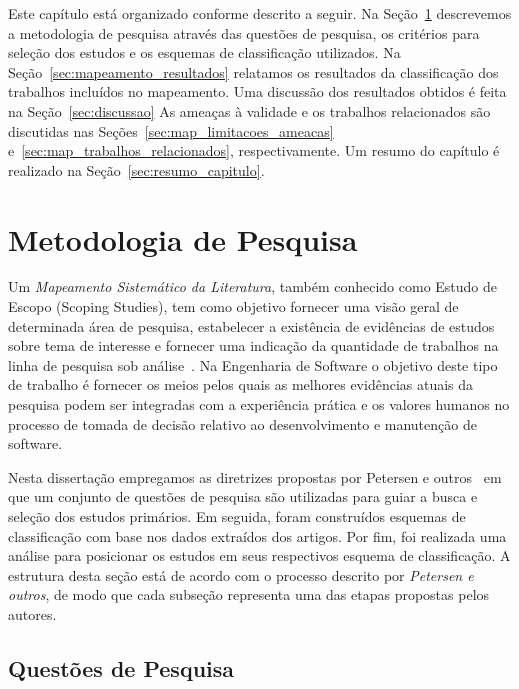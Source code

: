Este capítulo está organizado conforme descrito a seguir. Na
Seção~\ref{sec:map-metodologia} descrevemos a metodologia de pesquisa através
das questões de pesquisa, os critérios para seleção dos estudos  e os esquemas
de classificação utilizados. Na Seção~\ref{sec:mapeamento_resultados} relatamos
os resultados da classificação dos trabalhos incluídos no mapeamento. Uma
discussão dos resultados obtidos é feita na Seção~\ref{sec:discussao} As ameaças
à validade e os trabalhos relacionados são discutidas nas
Seções~\ref{sec:map_limitacoes_ameacas} e~\ref{sec:map_trabalhos_relacionados},
respectivamente. Um resumo do capítulo é realizado na
Seção~\ref{sec:resumo_capitulo}.

\section{Metodologia de Pesquisa}
\label{sec:map-metodologia}

Um \textit{Mapeamento Sistemático da Literatura}, também conhecido como Estudo
de Escopo (Scoping Studies), tem como objetivo fornecer uma visão geral de
determinada área de pesquisa, estabelecer a existência de evidências de estudos
sobre tema de interesse e fornecer uma indicação da quantidade de trabalhos na
linha de pesquisa sob
análise~\cite{keele2007guidelines,wohlin2012experimentation}. Na Engenharia de
Software o objetivo deste tipo de trabalho é fornecer os meios pelos quais as
melhores evidências atuais da pesquisa podem ser integradas com a experiência
prática e os valores humanos no processo de tomada de decisão relativo ao
desenvolvimento e manutenção de software.

Nesta dissertação empregamos as diretrizes propostas por Petersen e
outros~\cite{Petersen2008} em que um conjunto de questões de pesquisa são
utilizadas para guiar a busca e seleção dos estudos primários. Em seguida, foram
construídos esquemas de classificação com base nos dados extraídos dos artigos.
Por fim, foi realizada uma análise para posicionar os estudos em seus
respectivos esquema de classificação. A estrutura desta seção está de acordo com
o processo descrito por \textit{Petersen e outros}, de modo que cada subseção
representa uma das etapas propostas pelos autores.

\subsection{Questões de Pesquisa}
\label{subsec:map-questoes-de-pesquisa}

